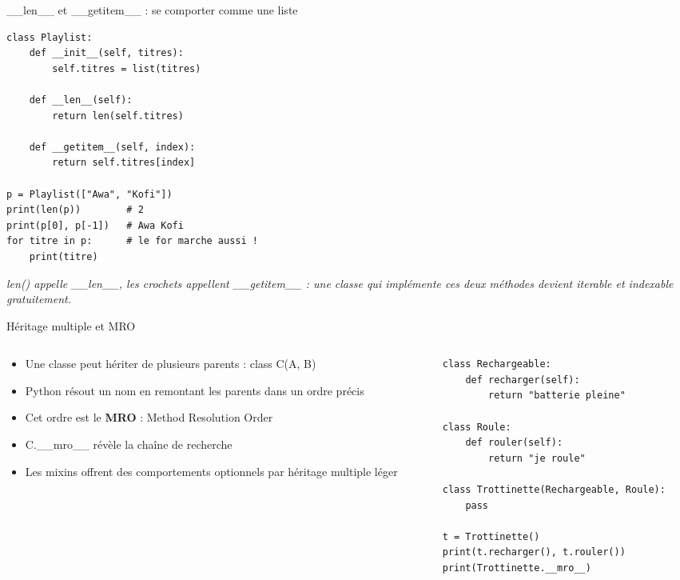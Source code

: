 \documentclass[aspectratio=169,11pt]{beamer}
\begin{document}
\begin{frame}[fragile]{\_\_len\_\_ et \_\_getitem\_\_ : se comporter comme une liste}

\begin{lstlisting}[style=py]
class Playlist:
    def __init__(self, titres):
        self.titres = list(titres)

    def __len__(self):
        return len(self.titres)

    def __getitem__(self, index):
        return self.titres[index]

p = Playlist(["Awa", "Kofi"])
print(len(p))        # 2
print(p[0], p[-1])   # Awa Kofi
for titre in p:      # le for marche aussi !
    print(titre)
\end{lstlisting}
\vspace{0.5pt}

{\small\color{PyGris}\itshape len() appelle \_\_len\_\_, les crochets appellent \_\_getitem\_\_ : une classe qui implémente ces deux méthodes devient iterable et indexable gratuitement.}

\end{frame}

\begin{frame}[fragile]{Héritage multiple et MRO}
\begin{columns}[t]
\begin{column}{0.42\textwidth}
\begin{itemize}
  \setlength{\itemsep}{1.5pt}\setlength{\parskip}{0pt}
  \item Une classe peut hériter de plusieurs parents : class C(A, B)
  \item Python résout un nom en remontant les parents dans un ordre précis
  \item Cet ordre est le \textbf{MRO} : Method Resolution Order
  \item C.\_\_mro\_\_ révèle la chaîne de recherche
  \item Les mixins offrent des comportements optionnels par héritage multiple léger
\end{itemize}
\end{column}
\hspace{0.02\textwidth}
\begin{column}{0.55\textwidth}
\begin{lstlisting}[style=pysmall]
class Rechargeable:
    def recharger(self):
        return "batterie pleine"

class Roule:
    def rouler(self):
        return "je roule"

class Trottinette(Rechargeable, Roule):
    pass

t = Trottinette()
print(t.recharger(), t.rouler())
print(Trottinette.__mro__)
\end{lstlisting}
\end{column}
\end{columns}
\end{frame}
\end{document}
